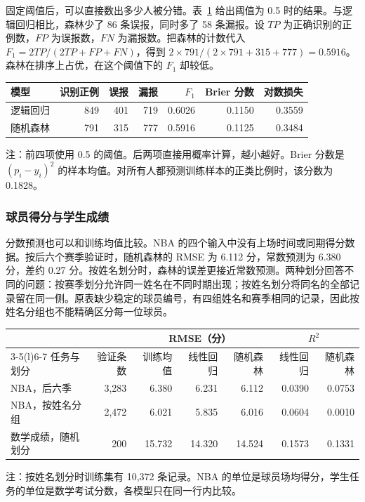 \documentclass[12pt,journal,onecolumn,a4paper]{IEEEtran}
\newcommand{\tabnote}[1]{\par\vspace{2pt}\begin{minipage}{\linewidth}\footnotesize #1\end{minipage}}
\newcommand{\inlinetab}[1]{\begin{table}[!htbp]\centering\small #1\end{table}}
\begin{document}
固定阈值后，可以直接数出多少人被分错。表~\ref{tab:adult} 给出阈值为 0.5 时的结果。与逻辑回归相比，森林少了 86 条误报，同时多了 58 条漏报。设 $TP$ 为正确识别的正例数，$FP$ 为误报数，$FN$ 为漏报数。把森林的计数代入 $F_1=2TP/(2TP+FP+FN)$，得到 $2\times791/(2\times791+315+777)=0.5916$。森林在排序上占优，在这个阈值下的 $F_1$ 却较低。
\inlinetab{\label{tab:adult}
\begin{tabular}{@{}lrrrrrr@{}}\toprule
模型 & 识别正例 & 误报 & 漏报 & $F_1$ & Brier 分数 & 对数损失\\\midrule
逻辑回归 & 849 & 401 & 719 & 0.6026 & 0.1150 & 0.3559\\
随机森林 & 791 & 315 & 777 & 0.5916 & 0.1125 & 0.3484\\\bottomrule\end{tabular}
\tabnote{注：前四项使用 0.5 的阈值。后两项直接用概率计算，越小越好。Brier 分数是 $(p_i-y_i)^2$ 的样本均值。对所有人都预测训练样本的正类比例时，该分数为 0.1828。}}

\subsubsection{球员得分与学生成绩}
分数预测也可以和训练均值比较。NBA 的四个输入中没有上场时间或同期得分数据。按后六个赛季验证时，随机森林的 RMSE 为 6.112 分，常数预测为 6.380 分，差约 0.27 分。按姓名划分时，森林的误差更接近常数预测。两种划分回答不同的问题：按赛季划分允许同一姓名在不同时期出现；按姓名划分将同名的全部记录留在同一侧。原表缺少稳定的球员编号，有四组姓名和赛季相同的记录，因此按姓名分组也不能精确区分每一位球员。
\inlinetab{\label{tab:scores}
\begin{tabular}{@{}lrrrrrr@{}}\toprule
 & & \multicolumn{3}{c}{RMSE（分）} & \multicolumn{2}{c}{$R^2$}\\\cmidrule(lr){3-5}\cmidrule(l){6-7}
任务与划分 & 验证条数 & 训练均值 & 线性回归 & 随机森林 & 线性回归 & 随机森林\\\midrule
NBA，后六季 & 3,283 & 6.380 & 6.231 & 6.112 & 0.0390 & 0.0753\\
NBA，按姓名分组 & 2,472 & 6.021 & 5.835 & 6.016 & 0.0604 & 0.0010\\
数学成绩，随机划分 & 200 & 15.732 & 14.320 & 14.524 & 0.1573 & 0.1331\\\bottomrule\end{tabular}
\tabnote{注：按姓名划分时训练集有 10,372 条记录。NBA 的单位是球员场均得分，学生任务的单位是数学考试分数，各模型只在同一行内比较。}}
\end{document}
